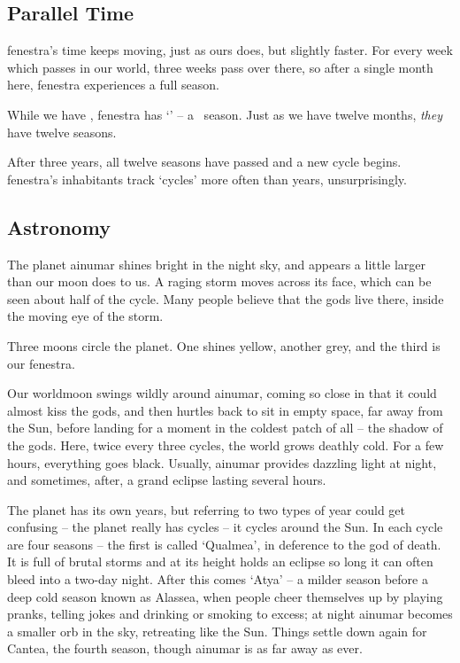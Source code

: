 \begin{multicols}{2}


\subsection{Parallel Time}

\Gls{fenestra}'s time keeps moving, just as ours does, but slightly faster.
For every week which passes in our world, three weeks pass over there, so after a single month here, \gls{fenestra} experiences a full season.

While we have \trackMonth, \gls{fenestra} has `\showSeason' -- a \showTemperature\ season.
Just as we have twelve months, \emph{they} have twelve seasons.

After three years, all twelve seasons have passed and a new cycle begins.
\Gls{fenestra}'s inhabitants track `cycles' more often than years, unsurprisingly.

\subsection{Astronomy}

The planet \gls{ainumar} shines bright in the night sky, and appears a little larger than our moon does to us.
A raging storm moves across its face, which can be seen about half of the cycle.
Many people believe that the gods live there, inside the moving eye of the storm.

Three moons circle the planet.
One shines yellow, another grey, and the third is our \gls{fenestra}.

Our worldmoon swings wildly around \gls{ainumar}, coming so close in that it could almost kiss the gods, and then hurtles back to sit in empty space, far away from the Sun, before landing for a moment in the coldest patch of all -- the shadow of the gods.
Here, twice every three cycles, the world grows deathly cold.
For a few hours, everything goes black.
Usually, \gls{ainumar} provides dazzling light at night, and sometimes, after, a grand eclipse lasting several hours.

The planet has its own years, but referring to two types of year could get confusing -- the planet really has cycles -- it cycles around the Sun.
In each cycle are four seasons -- the first is called `Qualmea', in deference to the god of death.
It is full of brutal storms and at its height holds an eclipse so long it can often bleed into a two-day night.
After this comes `Atya' -- a milder season before a deep cold season known as Alassea, when people cheer themselves up by playing pranks, telling jokes and drinking or smoking to excess; at night \gls{ainumar} becomes a smaller orb in the sky, retreating like the Sun.
Things settle down again for Cantea, the fourth season, though \gls{ainumar} is as far away as ever.


\end{multicols}
